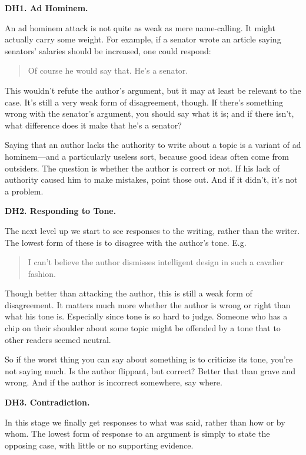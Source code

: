 \textbf{DH1. Ad Hominem.}

An ad hominem attack is not quite as weak as mere name-calling. It might
actually carry some weight. For example, if a senator wrote an article
saying senators' salaries should be increased, one could respond:

\begin{quote}
Of course he would say that. He's a senator.
\end{quote}

This wouldn't refute the author's argument, but it may at least be
relevant to the case. It's still a very weak form of disagreement,
though. If there's something wrong with the senator's argument, you
should say what it is; and if there isn't, what difference does it make
that he's a senator?

Saying that an author lacks the authority to write about a topic is a
variant of ad hominem---and a particularly useless sort, because good
ideas often come from outsiders. The question is whether the author is
correct or not. If his lack of authority caused him to make mistakes,
point those out. And if it didn't, it's not a problem.

\textbf{DH2. Responding to Tone.}

The next level up we start to see responses to the writing, rather than
the writer. The lowest form of these is to disagree with the author's
tone. E.g.

\begin{quote}
I can't believe the author dismisses intelligent design in such a
cavalier fashion.
\end{quote}

Though better than attacking the author, this is still a weak form of
disagreement. It matters much more whether the author is wrong or right
than what his tone is. Especially since tone is so hard to judge.
Someone who has a chip on their shoulder about some topic might be
offended by a tone that to other readers seemed neutral.

So if the worst thing you can say about something is to criticize its
tone, you're not saying much. Is the author flippant, but correct?
Better that than grave and wrong. And if the author is incorrect
somewhere, say where.

\textbf{DH3. Contradiction.}

In this stage we finally get responses to what was said, rather than how
or by whom. The lowest form of response to an argument is simply to
state the opposing case, with little or no supporting evidence.

